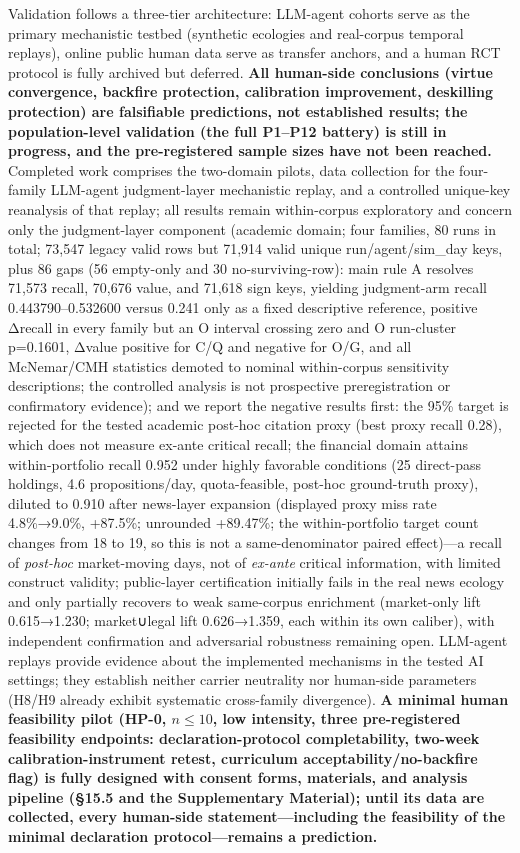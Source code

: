 \documentclass[
  11pt]{article}
\begin{document}
Validation follows a three-tier architecture: LLM-agent cohorts serve as
the primary mechanistic testbed (synthetic ecologies and real-corpus
temporal replays), online public human data serve as transfer anchors,
and a human RCT protocol is fully archived but deferred. \textbf{All
human-side conclusions (virtue convergence, backfire protection,
calibration improvement, deskilling protection) are falsifiable
predictions, not established results; the population-level validation
(the full P1--P12 battery) is still in progress, and the pre-registered
sample sizes have not been reached.} Completed work comprises the
two-domain pilots, data collection for the four-family LLM-agent
judgment-layer mechanistic replay, and a controlled unique-key
reanalysis of that replay; all results remain within-corpus exploratory
and concern only the judgment-layer component (academic domain; four
families, 80 runs in total; 73,547 legacy valid rows but 71,914 valid
unique run/agent/sim\_day keys, plus 86 gaps (56 empty-only and 30
no-surviving-row): main rule A resolves 71,573 recall, 70,676 value, and
71,618 sign keys, yielding judgment-arm recall 0.443790--0.532600 versus
0.241 only as a fixed descriptive reference, positive Δrecall in every
family but an O interval crossing zero and O run-cluster p=0.1601,
Δvalue positive for C/Q and negative for O/G, and all McNemar/CMH
statistics demoted to nominal within-corpus sensitivity descriptions;
the controlled analysis is not prospective preregistration or
confirmatory evidence); and we report the negative results first: the
95\% target is rejected for the tested academic post-hoc citation proxy
(best proxy recall 0.28), which does not measure ex-ante critical
recall; the financial domain attains within-portfolio recall 0.952 under
highly favorable conditions (25 direct-pass holdings, 4.6
propositions/day, quota-feasible, post-hoc ground-truth proxy), diluted
to 0.910 after news-layer expansion (displayed proxy miss rate
4.8\%→9.0\%, +87.5\%; unrounded +89.47\%; the within-portfolio target
count changes from 18 to 19, so this is not a same-denominator paired
effect)---a recall of \emph{post-hoc} market-moving days, not of
\emph{ex-ante} critical information, with limited construct validity;
public-layer certification initially fails in the real news ecology and
only partially recovers to weak same-corpus enrichment (market-only lift
0.615→1.230; market∪legal lift 0.626→1.359, each within its own
caliber), with independent confirmation and adversarial robustness
remaining open. LLM-agent replays provide evidence about the implemented
mechanisms in the tested AI settings; they establish neither carrier
neutrality nor human-side parameters (H8/H9 already exhibit systematic
cross-family divergence). \textbf{A minimal human feasibility pilot
(HP-0, \(n \le 10\), low intensity, three pre-registered feasibility
endpoints: declaration-protocol completability, two-week
calibration-instrument retest, curriculum acceptability/no-backfire
flag) is fully designed with consent forms, materials, and analysis
pipeline (§15.5 and the Supplementary Material); until its data are
collected, every human-side statement---including the feasibility of the
minimal declaration protocol---remains a prediction.}
\end{document}
